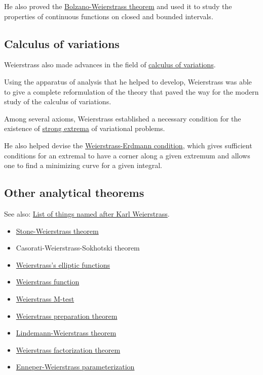 \documentclass{book}
\numberwithin{equation}{section}
\begin{document}
He also proved the \href{https://en.wikipedia.org/wiki/Bolzano-Weierstrass_theorem}{Bolzano-Weierstrass theorem} and used it to study the properties of continuous functions on closed and bounded intervals.

\subsection{Calculus of variations}
Weierstrass also made advances in the field of \href{https://en.wikipedia.org/wiki/Calculus_of_variations}{calculus of variations}.

Using the apparatus of analysis that he helped to develop, Weierstrass was able to give a complete reformulation of the theory that paved the way for the modern study of the calculus of variations.

Among several axioms, Weierstrass established a necessary condition for the existence of \href{https://en.wikipedia.org/wiki/Strong_extrema}{strong extrema} of variational problems.

He also helped devise the \href{https://en.wikipedia.org/wiki/Weierstrass-Erdmann_condition}{Weierstrass-Erdmann condition}, which gives sufficient conditions for an extremal to have a corner along a given extremum and allows one to find a minimizing curve for a given integral.

\subsection{Other analytical theorems}
See also: \href{https://en.wikipedia.org/wiki/List_of_things_named_after_Karl_Weierstrass}{List of things named after Karl Weierstrass}.

%
\begin{itemize}
    \item \href{https://en.wikipedia.org/wiki/Stone-Weierstrass_theorem}{Stone-Weierstrass theorem}
    \item Casorati-Weierstrass-Sokhotski theorem
    \item \href{https://en.wikipedia.org/wiki/Weierstrass's_elliptic_functions}{Weierstrass's elliptic functions}
    \item \href{https://en.wikipedia.org/wiki/Weierstrass\_function}{Weierstrass function}
    \item \href{https://en.wikipedia.org/wiki/Weierstrass_M-test}{Weierstrass M-test}
    \item \href{https://en.wikipedia.org/wiki/Weierstrass_preparation_theorem}{Weierstrass preparation theorem}
    \item \href{https://en.wikipedia.org/wiki/Lindemann-Weierstrass_theorem}{Lindemann-Weierstrass theorem}
    \item \href{https://en.wikipedia.org/wiki/Weierstrass_factorization_theorem}{Weierstrass factorization theorem}
    \item \href{https://en.wikipedia.org/wiki/Enneper-Weierstrass_parameterization}{Enneper-Weierstrass parameterization}
\end{itemize}
\end{document}
